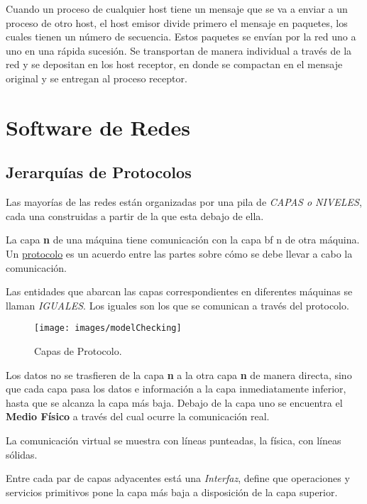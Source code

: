 \documentclass[12pt]{report}
\begin{document}
Cuando un proceso de cualquier host tiene un mensaje que se va a enviar a un proceso de otro host, el host emisor divide primero el mensaje en paquetes, los cuales tienen un n\'umero de secuencia. Estos paquetes se env\'ian por la red uno a uno en una r\'apida sucesi\'on. Se transportan de manera individual a trav\'es de la red y se depositan en los host receptor, en donde se compactan en el mensaje original y se entregan al proceso receptor. 

\section*{Software de Redes}
\subsection*{Jerarqu\'ias de Protocolos}

Las mayor\'ias de las redes est\'an organizadas por una pila de \textit {CAPAS o NIVELES}, cada una construidas a partir de la que esta debajo de ella. 

La capa {\bf n} de una m\'aquina tiene comunicaci\'on con la capa {bf n} de otra m\'aquina. Un \underline {protocolo} es un acuerdo entre las partes sobre c\'omo se debe llevar a cabo la comunicaci\'on.
 
Las entidades que abarcan las capas correspondientes en diferentes m\'aquinas se llaman \textit {IGUALES}. Los iguales son los que se comunican a trav\'es del protocolo.

\begin{figure}[!h]
\texttt{[image: images/modelChecking]}
\caption{Capas de Protocolo.}
\label{modelchecking-IO}
\end{figure}

Los datos no se trasfieren de la capa {\bf n}  a la otra capa {\bf n} de manera directa, sino que cada capa pasa los datos e informaci\'on a la capa inmediatamente inferior, hasta que se alcanza la capa m\'as baja. Debajo de la capa uno se encuentra el {\bf Medio F\'isico} a trav\'es del cual ocurre la comunicaci\'on real.

La comunicaci\'on virtual se muestra con l\'ineas punteadas, la f\'isica, con l\'ineas s\'olidas.

Entre cada par de capas adyacentes est\'a una \textit {Interfaz}, define que operaciones y servicios primitivos pone la capa m\'as baja a disposici\'on de la capa superior.
\end{document}
